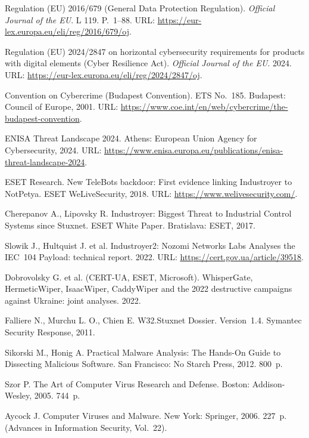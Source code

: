  Regulation (EU) 2016/679 (General Data Protection Regulation). \emph{Official Journal of the EU}. L 119. P.~1--88. URL: \url{https://eur-lex.europa.eu/eli/reg/2016/679/oj}.

 Regulation (EU) 2024/2847 on horizontal cybersecurity requirements for products with digital elements (Cyber Resilience Act). \emph{Official Journal of the EU}. 2024. URL: \url{https://eur-lex.europa.eu/eli/reg/2024/2847/oj}.

 Convention on Cybercrime (Budapest Convention). ETS No.~185. Budapest: Council of Europe, 2001. URL: \url{https://www.coe.int/en/web/cybercrime/the-budapest-convention}.

 ENISA Threat Landscape 2024. Athens: European Union Agency for Cybersecurity, 2024. URL: \url{https://www.enisa.europa.eu/publications/enisa-threat-landscape-2024}.

 ESET Research. New TeleBots backdoor: First evidence linking Industroyer to NotPetya. ESET WeLiveSecurity, 2018. URL: \url{https://www.welivesecurity.com/}.

 Cherepanov A., Lipovsky R. Industroyer: Biggest Threat to Industrial Control Systems since Stuxnet. ESET White Paper. Bratislava: ESET, 2017.

 Slowik J., Hultquist J. et al. Industroyer2: Nozomi Networks Labs Analyses the IEC~104 Payload: technical report. 2022. URL: \url{https://cert.gov.ua/article/39518}.

 Dobrovolsky G. et al. (CERT-UA, ESET, Microsoft). WhisperGate, HermeticWiper, IsaacWiper, CaddyWiper and the 2022 destructive campaigns against Ukraine: joint analyses. 2022.

 Falliere N., Murchu L. O., Chien E. W32.Stuxnet Dossier. Version~1.4. Symantec Security Response, 2011.

 Sikorski M., Honig A. Practical Malware Analysis: The Hands-On Guide to Dissecting Malicious Software. San Francisco: No Starch Press, 2012. 800~p.

 Szor P. The Art of Computer Virus Research and Defense. Boston: Addison-Wesley, 2005. 744~p.

 Aycock J. Computer Viruses and Malware. New York: Springer, 2006. 227~p. (Advances in Information Security, Vol.~22).

